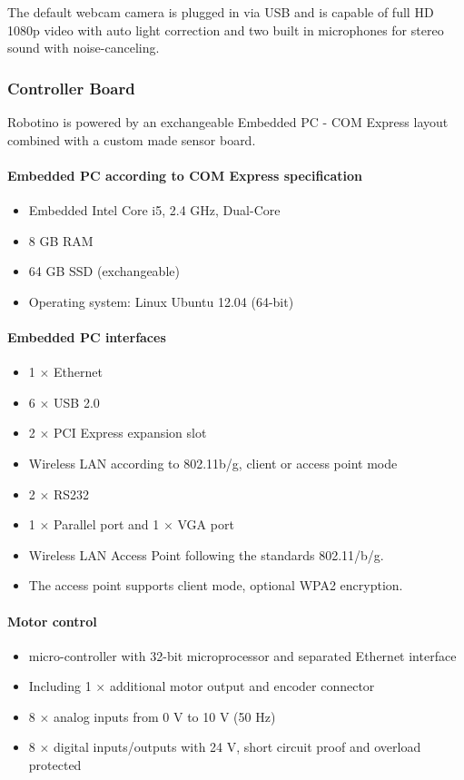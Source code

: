 \documentclass[12pt,twoside]{article}
\begin{document}
\begin{appendix}
The default webcam camera is plugged in via USB and is capable of full
HD 1080p video with auto light correction and two built in microphones
for stereo sound with noise-canceling.

\subsubsection{Controller Board}
Robotino is powered by an exchangeable Embedded PC - COM Express
layout combined with a custom made sensor board.

\paragraph{Embedded PC according to COM Express specification}
\begin{itemize}
\item Embedded Intel Core i5, 2.4 GHz, Dual-Core
\item 8 GB RAM
\item 64 GB SSD (exchangeable)
\item Operating system: Linux Ubuntu 12.04 (64-bit)
\end{itemize}

\paragraph{Embedded PC interfaces}
\begin{itemize}
\item 1 $\times$ Ethernet
\item 6 $\times$ USB 2.0
\item 2 $\times$ PCI Express expansion slot
\item Wireless LAN according to 802.11b/g, client or access point mode
\item 2 $\times$  RS232
\item 1 $\times$ Parallel port and 1 $\times$ VGA port
\item Wireless LAN Access Point following the standards 802.11/b/g.
\item The access point supports client mode, optional WPA2 encryption.
\end{itemize}

\paragraph{Motor control}
\begin{itemize}
\item micro-controller with 32-bit microprocessor and separated
  Ethernet interface
\item Including 1 $\times$ additional motor output and encoder
  connector
\item 8 $\times$ analog inputs from 0 V to 10 V (50 Hz)
\item 8 $\times$ digital inputs/outputs with 24 V, short circuit proof
  and overload protected
\end{itemize}


\end{appendix}
\end{document}
